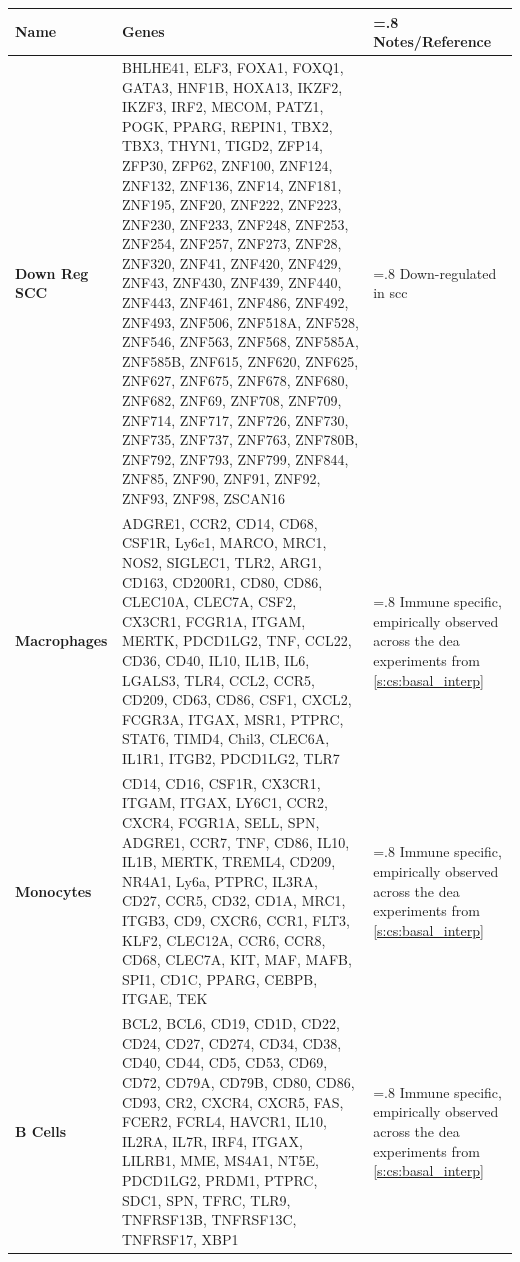 \begin{table}[H]
    \centering
    \scriptsize
    \begin{tabularx}{\textwidth}{>{\hsize=0.6\hsize}X|>{\hsize=1.6\hsize}X|>{\hsize=.8\hsize}X}
        \toprule
        \textbf{Name} & \textbf{Genes} & \textbf{Notes/Reference} \\
        \midrule
        \textbf{Down Reg SCC} & BHLHE41, ELF3, FOXA1, FOXQ1, GATA3, HNF1B, HOXA13, IKZF2, IKZF3, IRF2, MECOM, PATZ1, POGK, PPARG, REPIN1, TBX2, TBX3, THYN1, TIGD2, ZFP14, ZFP30, ZFP62, ZNF100, ZNF124, ZNF132, ZNF136, ZNF14, ZNF181, ZNF195, ZNF20, ZNF222, ZNF223, ZNF230, ZNF233, ZNF248, ZNF253, ZNF254, ZNF257, ZNF273, ZNF28, ZNF320, ZNF41, ZNF420, ZNF429, ZNF43, ZNF430, ZNF439, ZNF440, ZNF443, ZNF461, ZNF486, ZNF492, ZNF493, ZNF506, ZNF518A, ZNF528, ZNF546, ZNF563, ZNF568, ZNF585A, ZNF585B, ZNF615, ZNF620, ZNF625, ZNF627, ZNF675, ZNF678, ZNF680, ZNF682, ZNF69, ZNF708, ZNF709, ZNF714, ZNF717, ZNF726, ZNF730, ZNF735, ZNF737, ZNF763, ZNF780B, ZNF792, ZNF793, ZNF799, ZNF844, ZNF85, ZNF90, ZNF91, ZNF92, ZNF93, ZNF98, ZSCAN16 & Down-regulated in \acrfull{scc} \cite{Hurst2022-sp} \\
        \midrule
        \textbf{Macrophages} & ADGRE1, CCR2, CD14, CD68, CSF1R, Ly6c1, MARCO, MRC1, NOS2, SIGLEC1, TLR2, ARG1, CD163, CD200R1, CD80, CD86, CLEC10A, CLEC7A, CSF2, CX3CR1, FCGR1A, ITGAM, MERTK, PDCD1LG2, TNF, CCL22, CD36, CD40, IL10, IL1B, IL6, LGALS3, TLR4, CCL2, CCR5, CD209, CD63, CD86, CSF1, CXCL2, FCGR3A, ITGAX, MSR1, PTPRC, STAT6, TIMD4, Chil3, CLEC6A, IL1R1, ITGB2, PDCD1LG2, TLR7 & Immune specific, empirically observed across the \acrlong{dea} experiments from \cref{s:cs:basal_interp} \\
        \midrule
        \textbf{Monocytes} & CD14, CD16, CSF1R, CX3CR1, ITGAM, ITGAX, LY6C1, CCR2, CXCR4, FCGR1A, SELL, SPN, ADGRE1, CCR7, TNF, CD86, IL10, IL1B, MERTK, TREML4, CD209, NR4A1, Ly6a, PTPRC, IL3RA, CD27, CCR5, CD32, CD1A, MRC1, ITGB3, CD9, CXCR6, CCR1, FLT3, KLF2, CLEC12A, CCR6, CCR8, CD68, CLEC7A, KIT, MAF, MAFB, SPI1, CD1C, PPARG, CEBPB, ITGAE, TEK &  Immune specific, empirically observed across the \acrlong{dea} experiments from \cref{s:cs:basal_interp} \\
        \midrule
        \textbf{B Cells} & BCL2, BCL6, CD19, CD1D, CD22, CD24, CD27, CD274, CD34, CD38, CD40, CD44, CD5, CD53, CD69, CD72, CD79A, CD79B, CD80, CD86, CD93, CR2, CXCR4, CXCR5, FAS, FCER2, FCRL4, HAVCR1, IL10, IL2RA, IL7R, IRF4, ITGAX, LILRB1, MME, MS4A1, NT5E, PDCD1LG2, PRDM1, PTPRC, SDC1, SPN, TFRC, TLR9, TNFRSF13B, TNFRSF13C, TNFRSF17, XBP1 & Immune specific, empirically observed across the \acrlong{dea} experiments from \cref{s:cs:basal_interp} \\

\end{tabularx}
\end{table}
